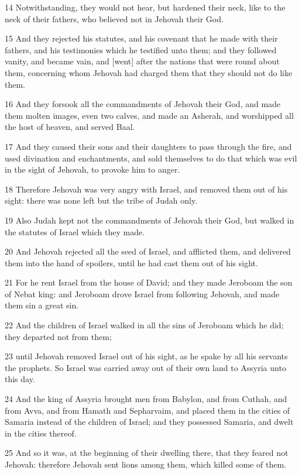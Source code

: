 \par 14 Notwithstanding, they would not hear, but hardened their neck, like to the neck of their fathers, who believed not in Jehovah their God.
\par 15 And they rejected his statutes, and his covenant that he made with their fathers, and his testimonies which he testified unto them; and they followed vanity, and became vain, and [went] after the nations that were round about them, concerning whom Jehovah had charged them that they should not do like them.
\par 16 And they forsook all the commandments of Jehovah their God, and made them molten images, even two calves, and made an Asherah, and worshipped all the host of heaven, and served Baal.
\par 17 And they caused their sons and their daughters to pass through the fire, and used divination and enchantments, and sold themselves to do that which was evil in the sight of Jehovah, to provoke him to anger.
\par 18 Therefore Jehovah was very angry with Israel, and removed them out of his sight: there was none left but the tribe of Judah only.
\par 19 Also Judah kept not the commandments of Jehovah their God, but walked in the statutes of Israel which they made.
\par 20 And Jehovah rejected all the seed of Israel, and afflicted them, and delivered them into the hand of spoilers, until he had cast them out of his sight.
\par 21 For he rent Israel from the house of David; and they made Jeroboam the son of Nebat king: and Jeroboam drove Israel from following Jehovah, and made them sin a great sin.
\par 22 And the children of Israel walked in all the sins of Jeroboam which he did; they departed not from them;
\par 23 until Jehovah removed Israel out of his sight, as he spake by all his servants the prophets. So Israel was carried away out of their own land to Assyria unto this day.
\par 24 And the king of Assyria brought men from Babylon, and from Cuthah, and from Avva, and from Hamath and Sepharvaim, and placed them in the cities of Samaria instead of the children of Israel; and they possessed Samaria, and dwelt in the cities thereof.
\par 25 And so it was, at the beginning of their dwelling there, that they feared not Jehovah: therefore Jehovah sent lions among them, which killed some of them.
